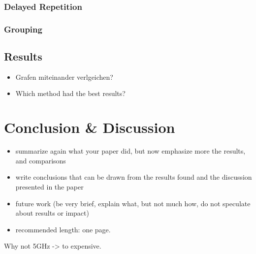 \documentclass[]{ccs-thesis}
\begin{document}
\subsection*{Delayed Repetition}
\subsection*{Grouping}

\section{Results}
\begin{itemize}
	\item Grafen miteinander verlgeichen?
	\item Which method had the best results?
\end{itemize}

\chapter{Conclusion \& Discussion}
\begin{itemize}
\item summarize again what your paper did, but now emphasize more the results, and comparisons
\item write conclusions that can be drawn from the results found and the discussion presented in the paper
\item future work (be very brief, explain what, but not much how, do not speculate about results or impact)
\item recommended length: one page.
\end{itemize}

Why not 5GHz -> to expensive.\\
\end{document}
